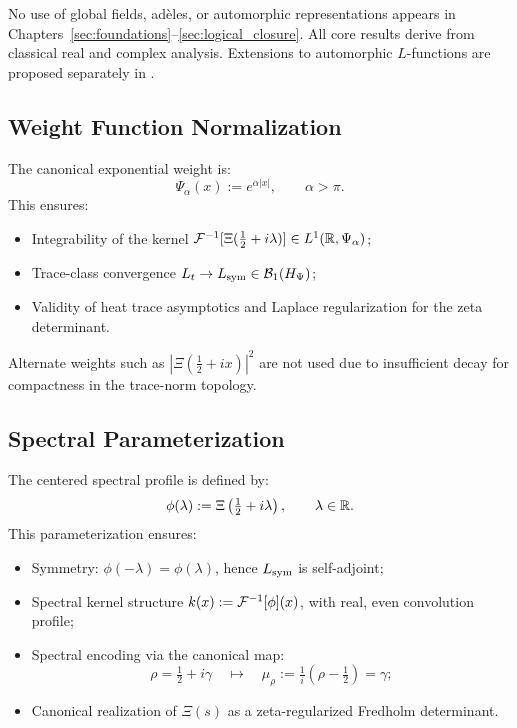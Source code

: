 No use of global fields, adèles, or automorphic representations appears in Chapters~\ref{sec:foundations}–\ref{sec:logical_closure}. All core results derive from classical real and complex analysis. Extensions to automorphic \( L \)-functions are proposed separately in .

\subsection*{Weight Function Normalization}

The canonical exponential weight is:
\[
\Psi_\alpha(x) := e^{\alpha |x|}, \qquad \alpha > \pi.
\]
This ensures:
\begin{itemize}
  \item Integrability of the kernel \( \mathcal{F}^{-1}[\Xi(\tfrac{1}{2} + i\lambda)] \in L^1(\mathbb{R}, \Psi_\alpha) \);
  \item Trace-class convergence \( L_t \to L_{\mathrm{sym}} \in \mathcal{B}_1(H_{\Psi}) \);
  \item Validity of heat trace asymptotics and Laplace regularization for the zeta determinant.
\end{itemize}

Alternate weights such as \( |\Xi(\tfrac{1}{2} + ix)|^2 \) are not used due to insufficient decay for compactness in the trace-norm topology.

\subsection*{Spectral Parameterization}

The centered spectral profile is defined by:
\[
\phi(\lambda) := \Xi\left( \tfrac{1}{2} + i\lambda \right), \qquad \lambda \in \mathbb{R}.
\]
This parameterization ensures:
\begin{itemize}
  \item Symmetry: \( \phi(-\lambda) = \phi(\lambda) \), hence \( L_{\mathrm{sym}} \) is self-adjoint;
  \item Spectral kernel structure \( k(x) := \mathcal{F}^{-1}[\phi](x) \), with real, even convolution profile;
  \item Spectral encoding via the canonical map:
  \[
  \rho = \tfrac{1}{2} + i\gamma \quad \longmapsto \quad \mu_\rho := \tfrac{1}{i}(\rho - \tfrac{1}{2}) = \gamma;
  \]
  \item Canonical realization of \( \Xi(s) \) as a zeta-regularized Fredholm determinant.
\end{itemize}
